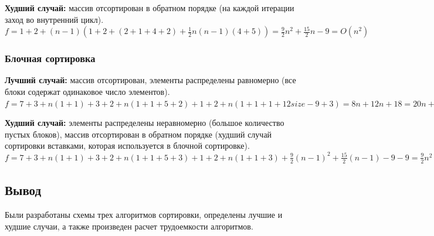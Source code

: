 \textbf{Худший случай:}  массив отсортирован в обратном порядке (на каждой итерации заход во внутренний цикл).\newline
$f = 1 + 2 + (n - 1)(1 + 2 + (2 + 1 + 4 + 2) + \frac{1}{2}n(n - 1)(4 + 5)) = \frac{9}{2}n^2 + \frac{15}{2}n - 9 = O(n^2) $


\subsubsection{Блочная сортировка}

\textbf{Лучший случай:} массив отсортирован, элементы распределены равномерно (все блоки содержат одинаковое число элементов).\newline
$f = 7 + 3 + n(1 + 1) + 3 + 2 + n(1 + 1 + 5 + 2) + 1 + 2 + n(1 + 1 + 1 + 12size - 9 + 3) = 8n + 12n + 18 = 20n + 18 = O(n) $

\textbf{Худший случай:} элементы распределены неравномерно (большое количество пустых блоков), массив отсортирован в обратном порядке (худший случай сортировки вставками, которая используется в блочной сортировке).\newline
$f = 7 + 3 + n(1 + 1) + 3 + 2 + n(1 + 1 + 5 + 3) + 1 + 2 + n(1 + 1 + 3) + \frac{9}{2}(n - 1)^2 + \frac{15}{2}(n - 1) - 9 - 9 = \frac{9}{2}n^2 + \frac{31}{2}n - 3 = O(n^2) $


\subsection*{Вывод}

Были разработаны схемы трех алгоритмов сортировки, определены лучшие и худшие случаи, а также произведен расчет трудоемкости алгоритмов.